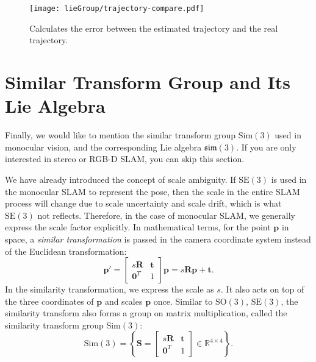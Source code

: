 \begin{figure}[!ht]
    \centering
    \texttt{[image: lieGroup/trajectory-compare.pdf]}
    \caption{Calculates the error between the estimated trajectory and the real trajectory. }
    \label{fig:trajectory-compare}
\end{figure}

\section{Similar Transform Group and Its Lie Algebra}
Finally, we would like to mention the similar transform group $\mathrm{Sim}(3)$ used in monocular vision, and the corresponding Lie algebra $\mathfrak{sim}(3)$. If you are only interested in stereo or RGB-D SLAM, you can skip this section.

We have already introduced the concept of scale ambiguity. If $\mathrm{SE}(3)$ is used in the monocular SLAM to represent the pose, then the scale in the entire SLAM process will change due to scale uncertainty and scale drift, which is what $\mathrm{SE}(3) $ not reflects. Therefore, in the case of monocular SLAM, we generally express the scale factor explicitly. In mathematical terms, for the point $\mathbf{p}$ in space, a \textit{similar transformation} is passed in the camera coordinate system instead of the Euclidean transformation:
\begin{equation}
\mathbf{p}' = \left[ {\begin{array}{*{20}{c}}
    {s\mathbf{R}}&\mathbf{t}\\
    {{\mathbf{0}^T}}&1
    \end{array}} \right] \mathbf{p}
= s\mathbf{R} \mathbf{p} + \mathbf{t}.
\end{equation}
In the similarity transformation, we express the scale as $s$. It also acts on top of the three coordinates of $\mathbf{p}$ and scales $\mathbf{p}$ once. Similar to $\mathrm{SO}(3)$, $\mathrm{SE}(3)$, the similarity transform also forms a group on matrix multiplication, called the similarity transform group $\mathrm{Sim}(3)$:
\begin{equation}
\mathrm{Sim}(3) = \left\{ { \mathbf{S} = \left[ {\begin{array}{*{20}{c}}
        {s\mathbf{R}}& \mathbf{t}\\
        {{\mathbf{0}^T}}&1
        \end{array}} \right] \in {\mathbb{R}^{4 \times 4}}} \right\}.
\end{equation}

